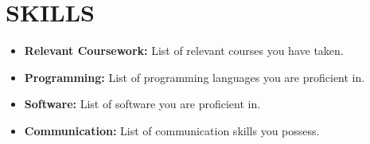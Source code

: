 \documentclass[a4paper,9pt]{extarticle}
\begin{document}
\section*{SKILLS}
\begin{itemize}
    \item \textbf{Relevant Coursework:} List of relevant courses you have taken.
    \item \textbf{Programming:} List of programming languages you are proficient in.
    \item \textbf{Software:} List of software you are proficient in.
    \item \textbf{Communication:} List of communication skills you possess.
\end{itemize}
\end{document}
